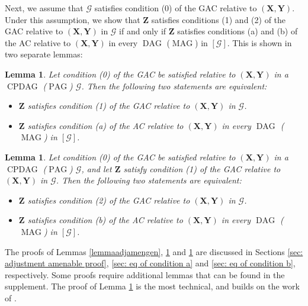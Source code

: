 \documentclass[]{article}
\DeclareMathOperator{\CPDAG}{CPDAG}
\DeclareMathOperator{\DAG}{DAG}
\DeclareMathOperator{\MAG}{MAG}
\DeclareMathOperator{\PAG}{PAG}
\newtheorem{lemma}[theorem]{Lemma}
\theoremstyle{definition}
\theoremstyle{remark}
\newcommand{\g}[1][G]{\mathcal{#1}}
\begin{document}
Next, we assume that $\g$ satisfies condition (0) of the GAC relative to $(\mathbf{X},\mathbf{Y})$.  Under this assumption, we show that $\mathbf{Z}$ satisfies conditions (1) and (2) of the GAC relative to $(\mathbf{X,Y})$ in $\g$ if and only if $\mathbf{Z}$ satisfies conditions (a) and (b) of the AC relative to $(\mathbf{X,Y})$ in every $\DAG$ ($\MAG$) in $[\g]$. This is shown in two separate lemmas:

\begin{lemma}
   Let condition (0) of the GAC be satisfied relative to $(\mathbf{X},\mathbf{Y})$ in a $\CPDAG$ ($\PAG$) $\g$. Then the following two statements are equivalent:
   \begin{itemize}
       \item $\mathbf{Z}$ satisfies condition (1) of the GAC relative to $(\mathbf{X},\mathbf{Y})$ in $\g$.
       \item $\mathbf{Z}$ satisfies condition (a) of the AC relative to $(\mathbf{X},\mathbf{Y})$ in every $\DAG$ ($\MAG$) in $[\g]$.
   \end{itemize}
   \label{lemmaprovingeqofacconditiona}
\end{lemma}

\begin{lemma}
   Let condition (0) of the GAC be satisfied relative to $(\mathbf{X},\mathbf{Y})$ in a $\CPDAG$ ($\PAG$) $\g$, and let $\mathbf{Z}$ satisfy condition (1) of the GAC relative to  $(\mathbf{X},\mathbf{Y})$ in $\g$. Then the following two statements are equivalent:
   \begin{itemize}
      \item $\mathbf{Z}$ satisfies condition (2) of the GAC relative to $(\mathbf{X},\mathbf{Y})$ in $\g$.
      \item $\mathbf{Z}$ satisfies condition (b) of the AC relative to $(\mathbf{X},\mathbf{Y})$ in every $\DAG$ ($\MAG$) in $[\g]$.
   \end{itemize}
   \label{lemmaequivalenceofcondb}
\end{lemma}

The proofs of Lemmas \ref{lemmaadjamengen}, \ref{lemmaprovingeqofacconditiona} and \ref{lemmaequivalenceofcondb} are discussed in Sections \ref{sec: adjustment amenable proof}, \ref{sec: eq of condition a} and \ref{sec: eq of condition b}, respectively. Some proofs require additional lemmas that can be found in the supplement. The proof of Lemma \ref{lemmaequivalenceofcondb} is the most technical, and builds on the work of \citet{zhang2006causal}.
\end{document}

